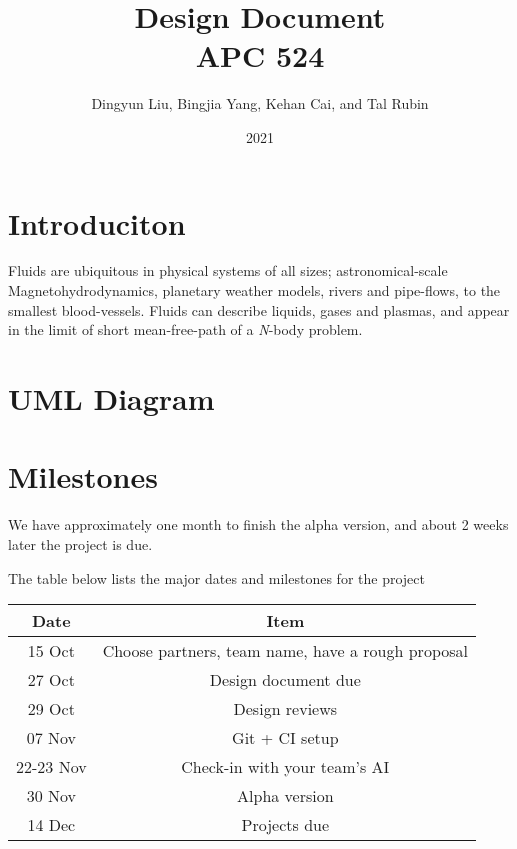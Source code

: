 \documentclass[aip, amsmath, amssymb, preprint,floatfix]{revtex4-2}
\begin{document}
\title{Design Document\\APC 524}
\date{2021}

\author{Dingyun Liu, Bingjia Yang, Kehan Cai, and Tal Rubin}
\maketitle

\section{Introduciton}

Fluids are ubiquitous in physical systems of all sizes; astronomical-scale Magnetohydrodynamics, planetary weather models, rivers and pipe-flows, to the smallest blood-vessels. Fluids can describe liquids, gases and plasmas, and appear in the limit of short mean-free-path of a \textit{N}-body problem.


\section{UML Diagram}

\section{Milestones}

We have approximately one month to finish the alpha version, and about 2 weeks later the project is due.

The table below lists the major dates and milestones for the project 

\begin{tabular}{c|c}
    Date & Item \\
    \hline
    15 Oct & Choose partners, team name, have a rough proposal \\
    27 Oct & Design document due \\
    29 Oct & Design reviews \\
    07 Nov & Git + CI setup \\
    22-23 Nov & Check-in with your team’s AI \\
    30 Nov & Alpha version \\
    14 Dec & Projects due \\
\end{tabular}
\end{document}
